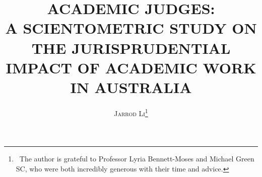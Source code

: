 \documentclass[12pt]{article}
\begin{document}

\thispagestyle{plain}

\title{\vspace{-25mm}\large{\textbf{\uppercase{Academic Judges:\\A Scientometric Study on the Jurisprudential Impact of Academic Work in Australia}}}}
\date{}
\author{\textsc{Jarrod Li}\thanks{\;\, The author is grateful to Professor Lyria Bennett-Moses and Michael Green SC, who were both incredibly generous with their time and advice.}}
\maketitle


\newpage

\thispagestyle{plain}

\tableofcontents
\newpage

\pagestyle{fancy}











\end{document}
